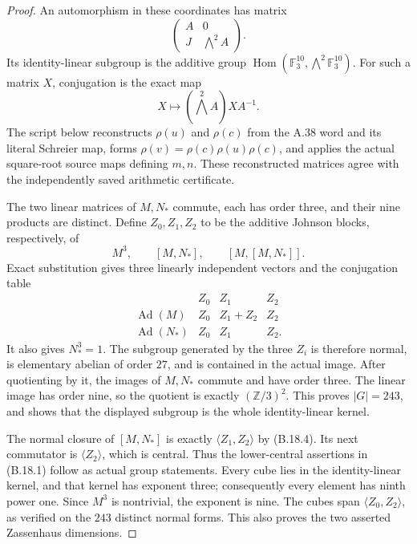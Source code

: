 \begin{proof}
An automorphism in these coordinates has matrix
\[
 \begin{pmatrix}A&0\\J&\bigwedge^2 A\end{pmatrix}.
\]
Its identity-linear subgroup is the additive group
$\operatorname{Hom}(\mathbb F_3^{10},
\bigwedge^2\mathbb F_3^{10})$.
For such a matrix $X$, conjugation is the exact map
\[
                  X\longmapsto
            (\bigwedge^2 A)XA^{-1}.                       \tag{B.18.3}
\]
The script below reconstructs $\rho(u)$ and $\rho(c)$
from the A.38 word and its literal Schreier map,
forms $\rho(v)=\rho(c)\rho(u)\rho(c)$, and applies
the actual square-root source maps defining $m,n$.
These reconstructed matrices agree with the
independently saved arithmetic certificate.

The two linear matrices of $M,N_*$ commute, each
has order three, and their nine products are
distinct. Define $Z_0,Z_1,Z_2$ to be the additive
Johnson blocks, respectively, of
\[
 M^3,\qquad [M,N_*],\qquad [M,[M,N_*]].
\]
Exact substitution gives three linearly independent
vectors and the conjugation table
\[
 \begin{array}{c|ccc}
       &Z_0&Z_1&Z_2\\\hline
 \operatorname{Ad}(M)&Z_0&Z_1+Z_2&Z_2\\
 \operatorname{Ad}(N_*)&Z_0&Z_1&Z_2.
 \end{array}                                                \tag{B.18.4}
\]
It also gives $N_*^3=1$. The subgroup generated
by the three $Z_i$ is therefore normal, is
elementary abelian of order $27$, and is contained
in the actual image. After quotienting by it,
the images of $M,N_*$ commute and have order
three. The linear image has order nine, so the
quotient is exactly $(\mathbb Z/3)^2$. This proves
$|G|=243$, and shows that the displayed subgroup
is the whole identity-linear kernel.

The normal closure of $[M,N_*]$ is exactly
$\langle Z_1,Z_2\rangle$ by (B.18.4). Its next
commutator is $\langle Z_2\rangle$, which is
central. Thus the lower-central assertions in
(B.18.1) follow as actual group statements.
Every cube lies in the identity-linear kernel,
and that kernel has exponent three; consequently
every element has ninth power one. Since $M^3$
is nontrivial, the exponent is nine. The cubes
span $\langle Z_0,Z_2\rangle$, as verified on
the $243$ distinct normal forms. This also proves
the two asserted Zassenhaus dimensions.


\end{proof}
